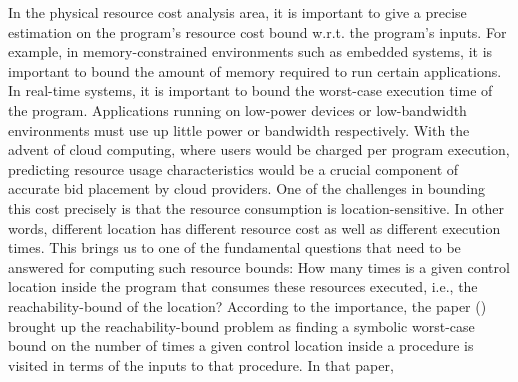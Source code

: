 In the physical resource cost analysis area, it is important to give a precise estimation
on the program's resource cost bound w.r.t. the program's inputs.
For example, in memory-constrained environments such as embedded systems,
it is important to bound the amount of memory required to run certain applications.
In real-time systems, it is important to bound the worst-case execution time of the program.
Applications running on low-power devices or low-bandwidth environments must use up little power or bandwidth respectively. 
With the advent of cloud computing, where users would be charged per program execution,
predicting resource usage characteristics would be a crucial component of accurate bid placement by cloud providers. 
One of the challenges in bounding this cost precisely is that the resource consumption is location-sensitive.
In other words, different location has different resource cost as well as different execution times.
This brings us to one of the fundamental questions that need to be answered for computing such resource bounds:
How many times is a given control location inside the program that consumes these resources executed, i.e., the
reachability-bound of the location?
According to the importance, the paper (\cite{GulwaniZ10}) brought up the reachability-bound problem as
finding a symbolic worst-case bound on the number of times a given control location 
inside a procedure is visited in terms of the inputs to that procedure.
 In that paper,
